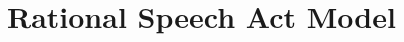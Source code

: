 \documentclass[floatsintext, doc]{apa6}
\begin{document}
%
%
%
%
%
%
%
%


\section{Rational Speech Act Model}
\end{document}
